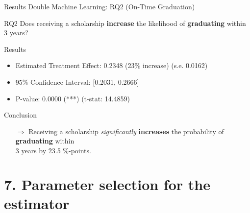 \documentclass[aspectratio=169]{beamer}
\begin{document}
\begin{frame}{Results Double Machine Learning: RQ2 (On-Time Graduation)}
\vspace{20pt}
\begin{alertblock}{RQ2}
	Does receiving a scholarship \textbf{increase} the likelihood of \textbf{graduating} within 3 years?
\end{alertblock}

\begin{block}{Results}
\begin{itemize}[label=--,itemsep=1pt,topsep=2pt]
	\item Estimated Treatment Effect: 0.2348 (23\% increase) (s.e. 0.0162)
	\item 95\% Confidence Interval: [0.2031, 0.2666]
	\item P-value: 0.0000 (***) (t-stat: 14.4859)
\end{itemize}
\end{block}

\begin{exampleblock}{Conclusion}
\vspace{-3pt}
\begin{itemize}
	\item [$\Rightarrow$]Receiving a scholarship \textit{significantly} \textbf{increases} the probability of \textbf{graduating} within \\ 3 years by 23.5 \%-points.
\end{itemize}
\vspace{-3pt}
	
\end{exampleblock}

\end{frame}




\section{7. Parameter selection for the estimator}
\end{document}
